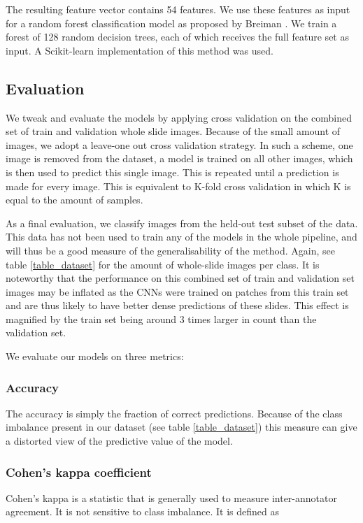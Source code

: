 \documentclass[journal]{IEEEtran}
\begin{document}
The resulting feature vector contains 54 features. We use these features as input for a random forest classification model as proposed by Breiman \cite{breiman2001random}. We train a forest of 128 random decision trees, each of which receives the full feature set as input. A Scikit-learn implementation of this method was used\cite{scikit-learn}.

\subsection{Evaluation}

We tweak and evaluate the models by applying cross validation on the combined set of train and validation whole slide images. Because of the small amount of images, we adopt a leave-one out cross validation strategy. In such a scheme,  one image is removed from the dataset, a model is trained on all other images, which is then used to predict this single image. This is repeated until a prediction is made for every image.  This is equivalent to K-fold cross validation in which K is equal to the amount of samples.

As a final evaluation, we classify images from the held-out test subset of the data. This data has not been used to train any of the models in the whole pipeline, and will thus be a good measure of the generalisability of the method. Again, see table \ref{table_dataset} for the amount of whole-slide images per class. It is noteworthy that the performance on this combined set of train and validation set images may be inflated as the CNNs were trained on patches from this train set and are thus likely to have better dense predictions of these slides. This effect is magnified by the train set being around 3 times larger in count than the validation set.

We evaluate our models on three metrics:
\subsubsection{Accuracy}
The accuracy is simply the fraction of correct predictions. Because of the class imbalance present in our dataset (see table \ref{table_dataset}) this measure can give a distorted view of the predictive value of the model.

\subsubsection{Cohen's kappa coefficient}
Cohen's kappa is a statistic that is generally used to measure inter-annotator agreement. It is not sensitive to class imbalance. It is defined as
\end{document}
